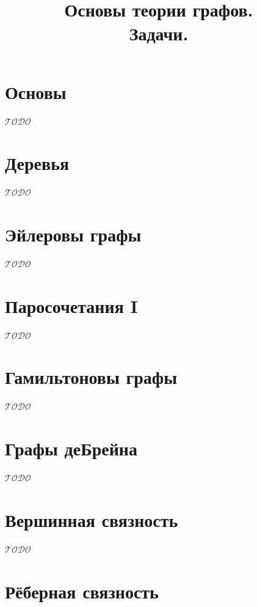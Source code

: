 \documentclass[a4paper,12pt]{article}
\title{Основы теории графов. \\ Задачи.}
\author{}
\date{}
\numberwithin{figure}{section}
\theoremstyle{remark}
\def\iiTODO{\guillemotleft$\mathcal{TODO}$\guillemotright\textellipsis}
\begin{document}
\maketitle

\tableofcontents



\section{Основы}

\iiTODO



\section{Деревья}

\iiTODO



\section{Эйлеровы графы}

\iiTODO



\section{Паросочетания I}

\iiTODO



\section{Гамильтоновы графы}

\iiTODO



\section{Графы деБрейна}

\iiTODO



\section{Вершинная связность}

\iiTODO




\section{Рёберная связность}
\end{document}
